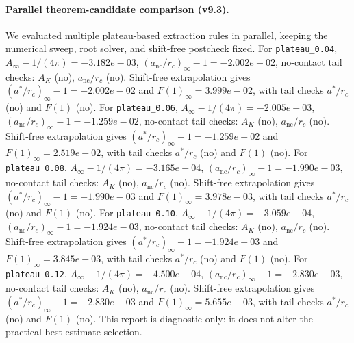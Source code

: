 \paragraph{Parallel theorem-candidate comparison (v9.3).}
We evaluated multiple plateau-based extraction rules in parallel, keeping the numerical sweep, root solver, and shift-free postcheck fixed. For \texttt{plateau_0.04}, $A_\infty-1/(4\pi)=-3.182e-03$, $(a_{\mathrm{nc}}/r_c)_\infty-1=-2.002e-02$, no-contact tail checks: $A_K$ (no), $a_{\mathrm{nc}}/r_c$ (no). Shift-free extrapolation gives $(a^*/r_c)_\infty-1=-2.002e-02$ and $F(1)_\infty=3.999e-02$, with tail checks $a^*/r_c$ (no) and $F(1)$ (no). For \texttt{plateau_0.06}, $A_\infty-1/(4\pi)=-2.005e-03$, $(a_{\mathrm{nc}}/r_c)_\infty-1=-1.259e-02$, no-contact tail checks: $A_K$ (no), $a_{\mathrm{nc}}/r_c$ (no). Shift-free extrapolation gives $(a^*/r_c)_\infty-1=-1.259e-02$ and $F(1)_\infty=2.519e-02$, with tail checks $a^*/r_c$ (no) and $F(1)$ (no). For \texttt{plateau_0.08}, $A_\infty-1/(4\pi)=-3.165e-04$, $(a_{\mathrm{nc}}/r_c)_\infty-1=-1.990e-03$, no-contact tail checks: $A_K$ (no), $a_{\mathrm{nc}}/r_c$ (no). Shift-free extrapolation gives $(a^*/r_c)_\infty-1=-1.990e-03$ and $F(1)_\infty=3.978e-03$, with tail checks $a^*/r_c$ (no) and $F(1)$ (no). For \texttt{plateau_0.10}, $A_\infty-1/(4\pi)=-3.059e-04$, $(a_{\mathrm{nc}}/r_c)_\infty-1=-1.924e-03$, no-contact tail checks: $A_K$ (no), $a_{\mathrm{nc}}/r_c$ (no). Shift-free extrapolation gives $(a^*/r_c)_\infty-1=-1.924e-03$ and $F(1)_\infty=3.845e-03$, with tail checks $a^*/r_c$ (no) and $F(1)$ (no). For \texttt{plateau_0.12}, $A_\infty-1/(4\pi)=-4.500e-04$, $(a_{\mathrm{nc}}/r_c)_\infty-1=-2.830e-03$, no-contact tail checks: $A_K$ (no), $a_{\mathrm{nc}}/r_c$ (no). Shift-free extrapolation gives $(a^*/r_c)_\infty-1=-2.830e-03$ and $F(1)_\infty=5.655e-03$, with tail checks $a^*/r_c$ (no) and $F(1)$ (no). This report is diagnostic only: it does not alter the practical best-estimate selection.
